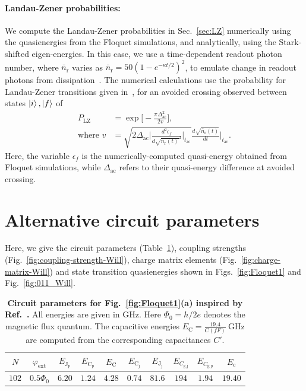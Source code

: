 \documentclass[%
reprint,
superscriptaddress,
 amsmath,amssymb,
 aps,
 prx,
longbibliography,
floatfix,
]{revtex4-2}
\begin{document}
\paragraph{Landau-Zener probabilities:}\label{app:LZ}
We compute the Landau-Zener probabilities in Sec.~\ref{sec:LZ} numerically using the quasienergies from the Floquet simulations, and analytically, using the Stark-shifted eigen-energies. In this case, we use a time-dependent readout photon number, where $\bar n_\textrm{r}$ varies as $\bar n_\textrm{r}=50(1-e^{-\kappa t/2})^2$, to emulate change in readout photons from dissipation~\cite{dumas2024unifie,khezri2023measurement}. The numerical calculations use the probability for Landau-Zener transitions given in~\cite{ikeda2022floquet}, for an avoided crossing observed between states $\ket{i},\ket{f}$ of
\begin{align}
    P_\textrm{LZ}&=\exp{\Big[-\frac{\pi \Delta_\textrm{ac}^2}{2v}\Big]},\\
    \text{where } v&=\sqrt{2\Delta_\textrm{ac}\Bigg|\frac{d^2\epsilon_f}{d\sqrt{\bar{n}_\textrm{r}(t)}^2}\Bigg|_{t_\textrm{ac}}}\frac{d\sqrt{\bar{n}_\textrm{r}(t)}}{dt}\Bigg|_{t_\textrm{ac}} .
\end{align}
Here, the variable $\epsilon_f$ is the numerically-computed quasi-energy obtained from Floquet simulations, while $\Delta_\textrm{ac}$ refers to their quasi-energy difference at avoided crossing. 

\section{Alternative circuit parameters}\label{app:alt_circuit1}
Here, we give the circuit parameters (Table~\ref{tab:circuit_params_Will}), coupling strengths (Fig.~\ref{fig:coupling-strength-Will}), charge matrix elements (Fig.~\ref{fig:charge-matrix-Will}) and state transition quasienergies shown in Figs.~\ref{fig:Floquet1} and Fig.~\ref{fig:011_Will}. 
\begin{table}[htb]
\centering
\begin{tabular}{|c|c|c|c|c|c|c|c|c|c|}
    \hline
     $N$ & $\varphi_{\textrm{ext}}$ & $E_{\textrm{J}_\textrm{p}}$ & $E_{\textrm{C}_\textrm{p}}$ & $E_{\textrm{C}}$ & $E_{\textrm{C}_\textrm{j}}$ & $E_{\textrm{J}_\textrm{j}}$ & $E_{C_\textrm{g,j}}$ & $E_{C_\textrm{g,p}}$ & $E_{\textrm{c}}$ \\
    \hline
    $102$ & $0.5\Phi_0$ & $6.20$ & $1.24$ & $4.28$ & $0.74$ & $81.6$ & $194$ & $1.94$ & $19.40$ \\
    \hline
\end{tabular}
\caption{\textbf{Circuit parameters for Fig.~\ref{fig:Floquet1}(a) inspired by Ref.~\cite{ding_high-fidelity_2023}.} All energies are given in GHz. Here $\Phi_0=h/2e$ denotes the magnetic flux quantum. The capacitive energies $E_{\textrm{C}}=\frac{19.4}{{C}(fF)} \ \mathrm{GHz}$ are computed from the corresponding capacitances $C'$.}
\label{tab:circuit_params_Will}
\end{table}
\end{document}
